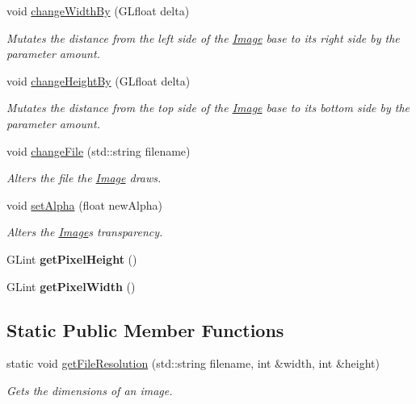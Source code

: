\begin{DoxyCompactItemize}
void \hyperlink{classtsgl_1_1_image_a3a02c78e7452c2b24ce71008cc6a2ee7}{change\+Width\+By} (G\+Lfloat delta)
\begin{DoxyCompactList}\small\item\em Mutates the distance from the left side of the \hyperlink{classtsgl_1_1_image}{Image} base to its right side by the parameter amount. \end{DoxyCompactList}\item 
void \hyperlink{classtsgl_1_1_image_aedbc8846201306dc6c0cc7fe7a607b25}{change\+Height\+By} (G\+Lfloat delta)
\begin{DoxyCompactList}\small\item\em Mutates the distance from the top side of the \hyperlink{classtsgl_1_1_image}{Image} base to its bottom side by the parameter amount. \end{DoxyCompactList}\item 
void \hyperlink{classtsgl_1_1_image_a9ff9d3c70b93b1d5c42e571c52b2a617}{change\+File} (std\+::string filename)
\begin{DoxyCompactList}\small\item\em Alters the file the \hyperlink{classtsgl_1_1_image}{Image} draws. \end{DoxyCompactList}\item 
void \hyperlink{classtsgl_1_1_image_a8d6beb3a072efc029af9ca66f7e2d399}{set\+Alpha} (float new\+Alpha)
\begin{DoxyCompactList}\small\item\em Alters the \hyperlink{classtsgl_1_1_image}{Image}\textquotesingle{}s transparency. \end{DoxyCompactList}\item 
\mbox{\label{classtsgl_1_1_image_aaae97ef27b8660d29abe66d1beabe7a3}} 
G\+Lint {\bfseries get\+Pixel\+Height} ()
\item 
\mbox{\label{classtsgl_1_1_image_aea54199ea329c9713c6f346e225a6a84}} 
G\+Lint {\bfseries get\+Pixel\+Width} ()
\end{DoxyCompactItemize}
\subsection*{Static Public Member Functions}
\begin{DoxyCompactItemize}
\item 
static void \hyperlink{classtsgl_1_1_image_a0bd9dc1bc0d4a18315226dec7493fcb2}{get\+File\+Resolution} (std\+::string filename, int \&width, int \&height)
\begin{DoxyCompactList}\small\item\em Gets the dimensions of an image. \end{DoxyCompactList}\end{DoxyCompactItemize}
